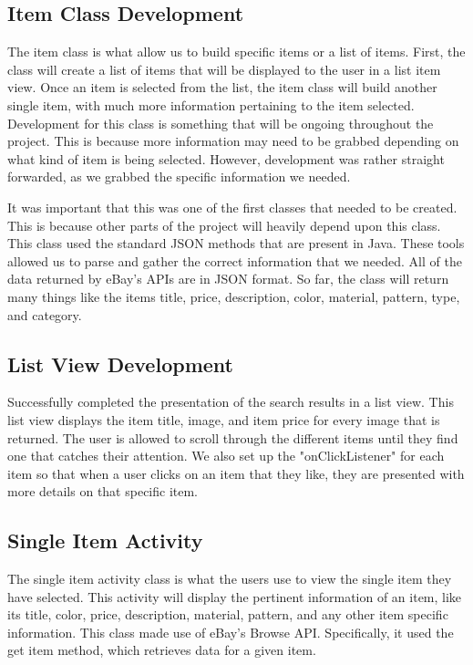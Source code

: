 \documentclass[journal,compsoc, 10pt, draftclsnofoot, onecolumn]{IEEEtran}
\begin{document}
\subsection{Item Class Development}
The item class is what allow us to build specific items or a list of items. 
First, the class will create a list of items that will be displayed to the 
user in a list item view. Once an item is selected from the list, the item 
class will build another single item, with much more information pertaining to 
the item selected. Development for this class is something that will be ongoing 
throughout the project. This is because more information may need to be grabbed 
depending on what kind of item is being selected. However, development was rather 
straight forwarded, as we grabbed the specific information we needed. \newline

It was important that this was one of the first classes that 
needed to be created. This is because other parts of the project will heavily 
depend upon this class. This class used the standard JSON methods that are 
present in Java. These tools allowed us to parse and gather the correct 
information that we needed. All of the data returned by eBay's APIs are in 
JSON format.  So far, the class will return many things like the items title, 
price, description, color, material, pattern, type, and category. 

\subsection{List View Development}
Successfully completed the presentation of the search results in a list view. 
This list view displays the item title, image, and item price for every image 
that is returned. The user is allowed to scroll through the different items 
until they find one that catches their attention. We also set up the 
"onClickListener" for each item so that when a user clicks on an item that they 
like, they are presented with more details on that specific item.


\subsection{Single Item Activity}
The single item activity class is what the users use to view the single item they 
have selected. This activity will display the pertinent information of an item, 
like its title, color, price, description, material, pattern, and any other item 
specific information. This class made use of eBay's Browse API. Specifically, it 
used the get item method, which retrieves data for a given item. 
\end{document}
